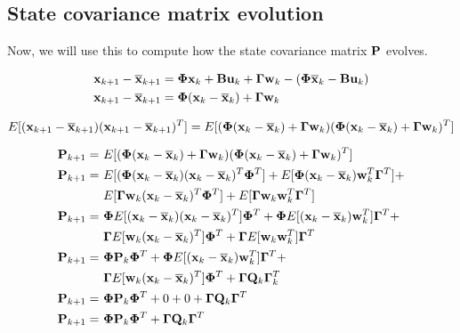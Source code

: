 \subsection{State covariance matrix evolution}

Now, we will use this to compute how the state covariance matrix $\mathbf{P}$
evolves.

\begin{align*}
  \mathbf{x}_{k+1} - \overline{\mathbf{x}}_{k+1} &= \mathbf{\Phi}\mathbf{x}_k +
    \mathbf{B}\mathbf{u}_k + \mathbf{\Gamma}\mathbf{w}_k - (\mathbf{\Phi}\overline{\mathbf{x}}_k -
    \mathbf{B}\mathbf{u}_k) \\
  \mathbf{x}_{k+1} - \overline{\mathbf{x}}_{k+1} &=
    \mathbf{\Phi}(\mathbf{x}_k - \overline{\mathbf{x}}_k) + \mathbf{\Gamma}\mathbf{w}_k
\end{align*}

\begin{equation*}
  E[(\mathbf{x}_{k+1} - \overline{\mathbf{x}}_{k+1})(\mathbf{x}_{k+1} - \overline{\mathbf{x}}_{k+1})^T] =
    E[(\mathbf{\Phi}(\mathbf{x}_k - \overline{\mathbf{x}}_k) + \mathbf{\Gamma}\mathbf{w}_k)
      (\mathbf{\Phi}(\mathbf{x}_k - \overline{\mathbf{x}}_k) + \mathbf{\Gamma}\mathbf{w}_k)^T]
\end{equation*}

\begin{align*}
  \mathbf{P}_{k+1} =~&
    E[(\mathbf{\Phi}(\mathbf{x}_k - \overline{\mathbf{x}}_k) + \mathbf{\Gamma}\mathbf{w}_k)
      (\mathbf{\Phi}(\mathbf{x}_k - \overline{\mathbf{x}}_k) + \mathbf{\Gamma}\mathbf{w}_k)^T] \\
  \mathbf{P}_{k+1} =~&
    E[(\mathbf{\Phi}(\mathbf{x}_k - \overline{\mathbf{x}}_k)(\mathbf{x}_k - \overline{\mathbf{x}}_k)^T
      \mathbf{\Phi}^T] +
    E[\mathbf{\Phi}(\mathbf{x}_k - \overline{\mathbf{x}}_k)\mathbf{w}_k^T\mathbf{\Gamma}^T] + \\
    &E[\mathbf{\Gamma}\mathbf{w}_k(\mathbf{x}_k - \overline{\mathbf{x}}_k)^T\mathbf{\Phi}^T] +
    E[\mathbf{\Gamma}\mathbf{w}_k\mathbf{w}_k^T\mathbf{\Gamma}^T] \\
  \mathbf{P}_{k+1} =~&
    \mathbf{\Phi}E[(\mathbf{x}_k - \overline{\mathbf{x}}_k)(\mathbf{x}_k - \overline{\mathbf{x}}_k)^T]
    \mathbf{\Phi}^T +
    \mathbf{\Phi}E[(\mathbf{x}_k - \overline{\mathbf{x}}_k)\mathbf{w}_k^T]\mathbf{\Gamma}^T + \\
    &\mathbf{\Gamma} E[\mathbf{w}_k(\mathbf{x}_k - \overline{\mathbf{x}}_k)^T]\mathbf{\Phi}^T +
    \mathbf{\Gamma} E[\mathbf{w}_k\mathbf{w}_k^T]\mathbf{\Gamma}^T \\
  \mathbf{P}_{k+1} =~& \mathbf{\Phi}\mathbf{P}_k\mathbf{\Phi}^T +
    \mathbf{\Phi}E[(\mathbf{x}_k - \overline{\mathbf{x}}_k)\mathbf{w}_k^T]\mathbf{\Gamma}^T + \\
    &\mathbf{\Gamma} E[\mathbf{w}_k(\mathbf{x}_k - \overline{\mathbf{x}}_k)^T]\mathbf{\Phi}^T +
    \mathbf{\Gamma}\mathbf{Q}_k\mathbf{\Gamma}_k^T \\
  \mathbf{P}_{k+1} =~& \mathbf{\Phi}\mathbf{P}_k\mathbf{\Phi}^T + 0 + 0 +
    \mathbf{\Gamma}\mathbf{Q}_k\mathbf{\Gamma}^T \\
  \mathbf{P}_{k+1} =~& \mathbf{\Phi}\mathbf{P}_k\mathbf{\Phi}^T +
    \mathbf{\Gamma}\mathbf{Q}_k\mathbf{\Gamma}^T
\end{align*}

